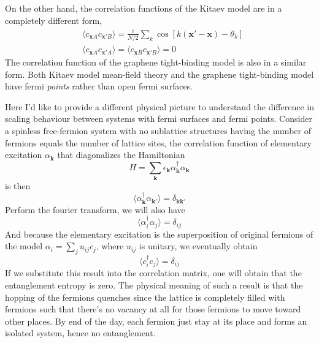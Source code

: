 \documentclass[12font]{article}
\theoremstyle{definition}
\numberwithin{equation}{section}
\newcommand{\anglelr}[1]{\langle #1 \rangle}
\newcommand{\llr}[1]{(  #1  )}
\newcommand{\llrm}[1]{[  #1  ]}
\newcommand{\bo}[1]{\mathbf{#1}}
\begin{document}
On the other hand, the correlation functions of the Kitaev model are in a completely different form,
\begin{equation}\label{correlationAB.e}
\begin{aligned}
&\anglelr{c_{\bo{x}A}c_{\bo{x}'B}} = \frac{i}{N/2}\sum_{k}\cos\llrm{k\llr{\bo{x}'-\bo{x}} - \theta_k} \\
&\anglelr{c_{\bo{x}A}c_{\bo{x}'A}} = \anglelr{c_{\bo{x}B}c_{\bo{x}'B}} = 0
\end{aligned}
\end{equation}
The correlation function of the graphene tight-binding model is also in a similar form. Both Kitaev model mean-field theory and the graphene tight-binding model have fermi \emph{points} rather than open fermi surfaces. 

Here I'd like to provide a different physical picture to understand the difference in scaling behaviour between systems with fermi surfaces and fermi points.  Consider a spinless free-fermion system with no sublattice structures having the number of fermions equals the number of lattice sites, the correlation function of elementary excitation $\alpha_{\bo{k}}$ that diagonalizes the Hamiltonian 
\[
H = \sum_{\bo{k}}\epsilon_{\bo{k}}\alpha^\dagger_{\bo{k}}\alpha_{\bo{k}}
\]
is then
\[
\anglelr{\alpha^\dagger_{\bo{k}}\alpha_{\bo{k}'}} = \delta_{\bo{k}\bo{k'}}
\]
Perform the fourier transform, we will also have 
\[
\anglelr{\alpha^\dagger_{i}\alpha_{j}} = \delta_{ij}
\]
And because the elementary excitation is the superposition of original fermions of the model $\alpha_i = \sum_{j}u_{ij}c_j$, where $u_{ij}$ is unitary, we eventually obtain
\[
\anglelr{c^\dagger_i c_j} = \delta_{ij}
\]
If we substitute this result into the correlation matrix, one will obtain that the entanglement entropy is zero. The physical meaning of such a result is that the hopping of the fermions quenches since the lattice is completely filled with fermions such that there's no vacancy at all for those fermions to move toward other places. By end of the day, each fermion just stay at its place and forms an isolated system, hence no entanglement. 
\end{document}
